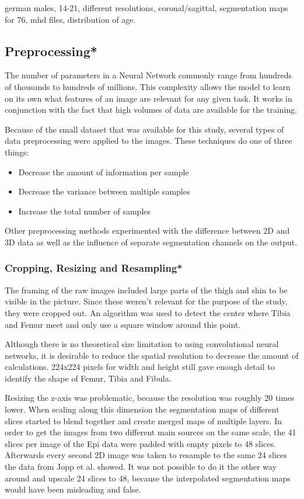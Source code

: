 german males, 14-21, different resolutions, coronal/sagittal, segmentation maps for 76, mhd files, distribution of age.



\subsection{Preprocessing*}

The number of parameters in a Neural Network commonly range from hundreds of thousands to hundreds of millions. This complexity allows the model to learn on its own what features of an image are relevant for any given task. It works in conjunction with the fact that high volumes of data are available for the training.

Because of the small dataset that was available for this study, several types of data preprocessing were applied to the images. These techniques do one of three things:

\begin{itemize}
\item Decrease the amount of information per sample
\item Decrease the variance between multiple samples
\item Increase the total number of samples
\end{itemize}

Other preprocessing methods experimented with the difference between 2D and 3D data as well as the influence of separate segmentation channels on the output.

\subsubsection{Cropping, Resizing and Resampling*}

The framing of the raw images included large parts of the thigh and shin to be visible in the picture. Since these weren't relevant for the purpose of the study, they were cropped out. An algorithm was used to detect the center where Tibia and Femur meet and only use a square window around this point.

Although there is no theoretical size limitation to using convolutional neural networks, it is desirable to reduce the spatial resolution to decrease the amount of calculations. 224x224 pixels for width and height still gave enough detail to identify the shape of Femur, Tibia and Fibula.

Resizing the z-axis was problematic, because the resolution was roughly 20 times lower. When scaling along this dimension the segmentation maps of different slices started to blend together and create merged maps of multiple layers. In order to get the images from two different main sources on the same scale, the 41 slices per image of the Epi data were padded with empty pixels to 48 slices. Afterwards every second 2D image was taken to resample to the same 24 slices the data from Jopp et al. showed. It was not possible to do it the other way around and upscale 24 slices to 48, because the interpolated segmentation maps would have been misleading and false.

